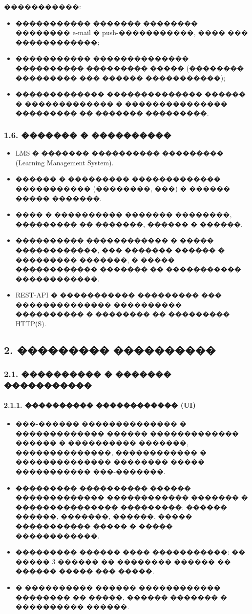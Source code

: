 \documentclass{G7-32}
\begin{document}
�����������:
\begin{itemize}
  \item ����������� ������� �������� �������� e-mail � push-�����������, ���� ��� ������������;
  \item ����������� �������������� ���������� ��������� ����� (�������� ��������� ��� ������ �����������);
  \item ������������� �������������� ������ � ������������� � ��������������� ��������� �� ������� ���������.
\end{itemize}

\subsubsection*{1.6. ������� � ����������}

\begin{itemize}
  \item LMS � ������� ���������� ��������� (Learning Management System).
  \item ������ � ��������� ������������� ����������� (��������, ���) � ������ ����� �������.
  \item ���� � ���������� ������� ��������, ��������� �� �������, ������ � ������.
  \item ���������� ������������ � ����� ������������, ��� ������� ������ � ��������� �������, � ����� ������������ ������� �� ����������� ������������.
  \item REST-API � ����������� ��������� ��� �������������� ���������� ���������� � �������� �� ��������� HTTP(S).
\end{itemize}

\subsection*{2. ��������� ����������}

\subsubsection*{2.1. ���������� � ������� �����������}

\paragraph{2.1.1. ���������� ������������ (UI)}

\begin{itemize}
  \item ���-������ �������������� � ������������� ������ ������������� ������ � ���������� �������, ��������������, ������������ � �������������� �������� ����� ����������� ���-�������.
  \item ��������� ���������� ������ ������������� ������������ ������� � ��������������� ���������: ������ ������, �������, ������, ����� ����������� ����� � ����� ������������.
  \item ��������� ������ ���� �����������: �� ����� 3 ������ �� �������� ������ �� ������ ����� ��� �����.
  \item � ���������� ������ ������������ �������� �� �����, ������ ������� � ���������� ������.
\end{itemize}
\end{document}
